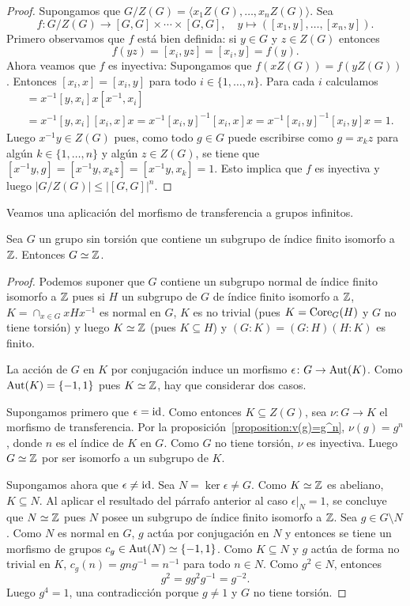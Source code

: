 \begin{proof}
	Supongamos que $G/Z(G)=\langle x_1Z(G),\dots,x_nZ(G)\rangle$. Sea 
	\[
		f\colon G/Z(G)\to [G,G]\times\cdots\times [G,G],
		\quad
		y\mapsto ([x_1,y],\dots,[x_n,y]).
	\]
	Primero observamos que $f$ está bien definida: si $y\in G$ y $z\in Z(G)$ entonces
	\[
		f(yz)=[x_i,yz]=[x_i,y]=f(y). 
	\]
	Ahora veamos que $f$ es inyectiva: Supongamos que $f(xZ(G))=f(yZ(G))$. Entonces
	$[x_i,x]=[x_i,y]$ para todo $i\in\{1,\dots,n\}$. Para cada $i$ calculamos
	\begin{align*}
		[x^{-1}y,x_i] &= x^{-1}[y,x_i]x[x^{-1},x_i]\\
		&=x^{-1}[y,x_i][x_i,x]x=x^{-1}[x_i,y]^{-1}[x_i,x]x=x^{-1}[x_i,y]^{-1}[x_i,y]x=1.
	\end{align*}
	Luego $x^{-1}y\in Z(G)$ pues, como 
	todo $g\in G$ puede escribirse como $g=x_kz$ para algún $k\in\{1,\dots,n\}$ y algún $z\in Z(G)$, se tiene
	que $[x^{-1}y,g]=[x^{-1}y,x_kz]=[x^{-1}y,x_k]=1$. Esto implica que $f$ es inyectiva y luego
	$|G/Z(G)|\leq |[G,G]|^n$. 
\end{proof}



Veamos una aplicación del morfismo de transferencia a grupos infinitos.

\begin{theorem}
	Sea $G$ un grupo sin torsión que contiene un subgrupo de índice finito
	isomorfo a $\mathbb{Z}$. Entonces $G\simeq\mathbb{Z}$.
\end{theorem}

\begin{proof}
	Podemos suponer que $G$ contiene un subgrupo normal de índice finito
	isomorfo a $\mathbb{Z}$ pues si $H$ un subgrupo de $G$ de índice finito isomorfo a
	$\mathbb{Z}$, $K=\cap_{x\in G}xHx^{-1}$ es normal en $G$, $K$ es no trivial (pues $K=\operatorname{Core}_G(H)$ y 
	$G$ no tiene torsión) y luego $K\simeq\mathbb{Z}$ (pues 
	$K\subseteq H$) y $(G:K)=(G:H)(H:K)$ es finito.

	La acción de $G$ en $K$ por conjugación induce un morfismo 
	$\epsilon\colon G\to\operatorname{Aut}(K)$. Como $\operatorname{Aut}(K)=\{-1,1\}$ pues $K\simeq\mathbb{Z}$, 
	hay que considerar dos casos. 
	
	Supongamos primero que $\epsilon=\operatorname{id}$. Como entonces $K\subseteq Z(G)$, sea
	$\nu\colon G\to K$ el morfismo de transferencia. Por la
	proposición~\ref{proposition:v(g)=g^n}, $\nu(g)=g^n$, donde $n$ es el
	índice de $K$ en $G$.  Como $G$ no tiene torsión, $\nu$ es inyectiva. Luego
	$G\simeq\mathbb{Z}$ por ser isomorfo a un subgrupo de $K$.

	Supongamos ahora que $\epsilon\ne\operatorname{id}$. Sea $N=\ker\epsilon\ne G$. Como
	$K\simeq\mathbb{Z}$ es abeliano, $K\subseteq N$. Al aplicar el resultado del
	párrafo anterior al caso $\epsilon|_N=1$, se concluye que $N\simeq\mathbb{Z}$ pues
	$N$ posee un subgrupo de índice finito isomorfo a $\mathbb{Z}$. Sea $g\in G\setminus N$. 
	Como $N$ es normal en $G$, $g$ actúa por conjugación en $N$ y entonces
	se tiene un morfismo de grupos $c_g\in\operatorname{Aut}(N)\simeq\{-1,1\}$. Como
	$K\subseteq N$ y $g$ actúa de forma no trivial en $K$, 
	$c_g(n)=gng^{-1}=n^{-1}$ para todo $n\in N$.  Como
	$g^2\in N$, entonces
	\[
		g^2=gg^2g^{-1}=g^{-2}.
	\]
	Luego $g^4=1$, una contradicción porque $g\ne1$ y $G$ no tiene torsión. 
\end{proof}


